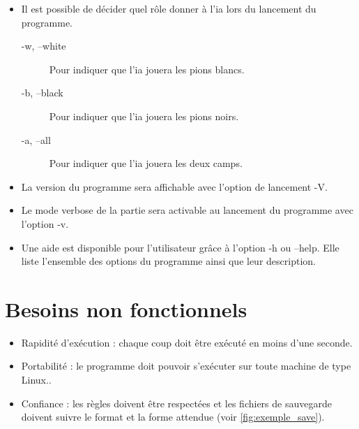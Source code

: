 \documentclass[10pt,a4paper]{article}
\begin{document}
\begin {itemize}
\begin{figure}[H]
\begin{BVerbatim}
    \end{BVerbatim}
    \caption {Exemple de grille générée avec l'option \textsc{-s2}.\label{fig:exemple_taille}}
  \end{figure}
\item  Il est possible de décider quel rôle donner à l'ia lors du lancement du programme.
  \begin{description}
  \item [-w, --white] Pour indiquer que l'ia jouera les pions blancs.
  \item [-b, --black] Pour indiquer que l'ia jouera les pions noirs.
  \item [-a, --all] Pour indiquer que l'ia jouera les deux camps.
  \end{description}
\item  La version du programme sera affichable avec l'option de lancement -V. 
\item  Le mode verbose de la partie sera activable au lancement du programme avec l'option -v. %
\item  Une aide est disponible pour l'utilisateur grâce à l'option -h ou --help. Elle liste l'ensemble des options du programme ainsi que leur description.
\end{itemize}

\newpage
\section{Besoins non fonctionnels}

\begin{itemize} 
\item Rapidité d'exécution : chaque coup doit être exécuté en moins d'une seconde.
\item Portabilité : le programme doit pouvoir s'exécuter sur toute machine de type Linux..
\item Confiance : les règles doivent être respectées et les fichiers de sauvegarde doivent suivre le format et la forme attendue (voir \ref{fig:exemple_save}).
\end{itemize}
\end{document}
